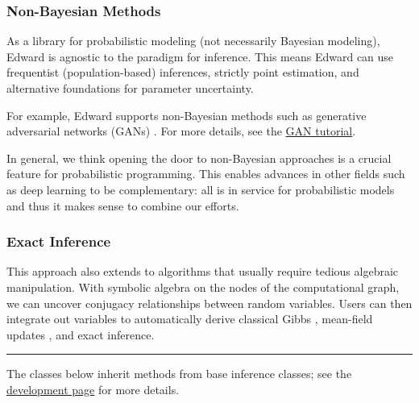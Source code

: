 \subsubsection{Non-Bayesian Methods}

As a library for probabilistic modeling (not necessarily Bayesian
modeling), Edward is agnostic to the paradigm for inference.  This
means Edward can use frequentist (population-based) inferences,
strictly point estimation, and alternative foundations for parameter
uncertainty.

For example, Edward supports non-Bayesian methods such as generative
adversarial networks (GANs)
\citep{goodfellow2014generative}.
For more details, see the \href{/tutorials/gan}{GAN tutorial}.

In general, we think opening the door to non-Bayesian approaches is a
crucial feature for probabilistic programming. This enables advances
in other fields such as deep learning to be complementary: all is in
service for probabilistic models and thus it makes sense to combine
our efforts.

\subsubsection{Exact Inference}

This approach also extends to algorithms that usually require tedious
algebraic manipulation.  With symbolic algebra on the nodes of the
computational graph, we can uncover conjugacy relationships between
random variables.  Users can then integrate out variables to
automatically derive classical Gibbs \citep{gelfand1990sampling},
mean-field updates \citep{bishop2006pattern}, and exact inference.

\begin{center}\rule{3in}{0.4pt}\end{center}

The classes below inherit methods from base inference classes;
see the \href{/api/inference-development}{development page} for more
details.

